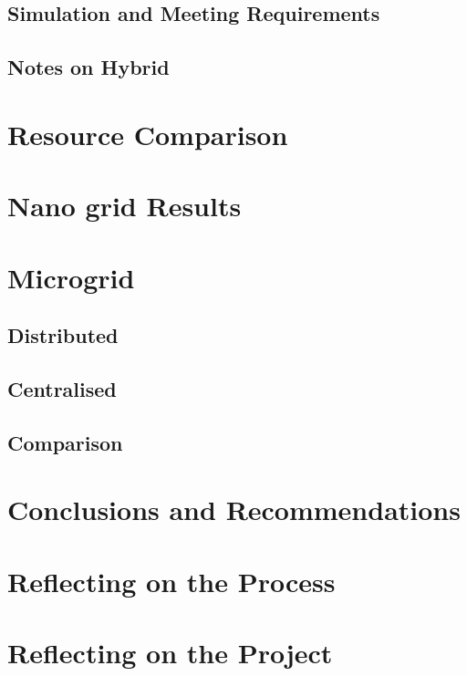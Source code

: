 \documentclass[journal]{IEEEtran}
\begin{document}
        
                

        
        \subsection{Simulation and Meeting Requirements}
        

        \subsection{Notes on Hybrid}

\section{Resource Comparison}

\section{Nano grid Results}

\section{Microgrid}
        \subsection{Distributed}
        \subsection{Centralised}
        \subsection{Comparison}

\section{Conclusions and Recommendations}

\section{Reflecting on the Process}

\section{Reflecting on the Project}



\newpage
\onecolumn
\appendices
\end{document}
